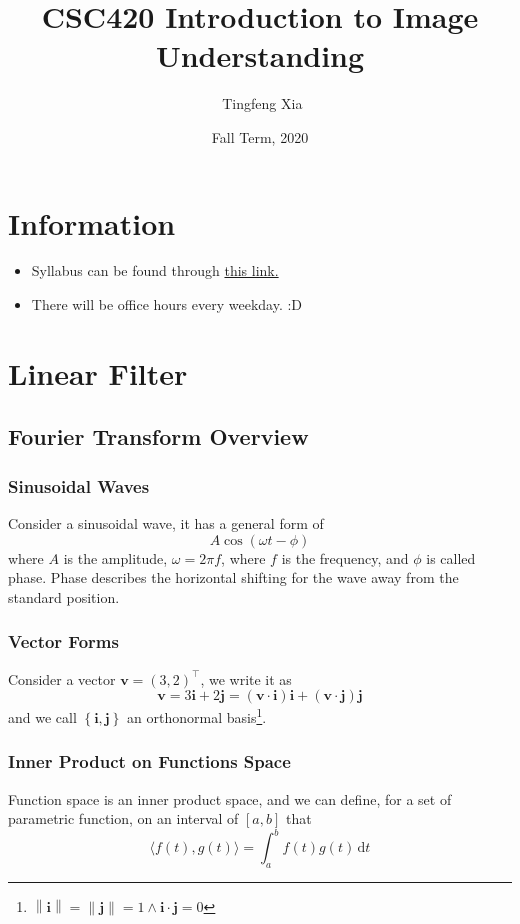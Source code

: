 \documentclass[11pt]{article}
\author{\ccLogo \,\,Tingfeng Xia}
\title{CSC420 Introduction to Image Understanding}
\date{Fall Term, 2020}
\newcommand{\bi}{\mathbf{i}}
\newcommand{\bj}{\mathbf{j}}
\newcommand{\bv}{\mathbf{v}}
\newcommand{\norm}[1]{\left\lVert#1\right\rVert}
\begin{document}
\maketitle
\doclicenseThis
\section*{Information}
\begin{itemize}
	\item Syllabus can be found through \href{https://q.utoronto.ca/courses/181228/files/8680178/preview}{this link. }
	\item There will be office hours every weekday. :D
\end{itemize}
\tableofcontents
\newpage
\section{Linear Filter}
\subsection{Fourier Transform Overview}
\subsubsection{Sinusoidal Waves\label{sec:sinwaves}}
Consider a sinusoidal wave, it has a general form of
\begin{equation}
	A\cos \left( \omega t - \phi \right)
\end{equation}
where $A$ is the amplitude, $\omega = 2\pi f$, where $f$ is the frequency, and $\phi$ is called phase. Phase describes the horizontal shifting for the wave away from the standard position. 

\subsubsection{Vector Forms}
Consider a vector $\bv = \left( 3, 2 \right)^\top$, we write it as 
\begin{equation}
	\bv = 3\bi + 2\bj = (\bv \cdot \bi) \bi + (\bv \cdot \bj) \bj
\end{equation}
and we call $\left\{ \bi, \bj \right\}$ an orthonormal basis\footnote{$\norm{\bi} = \norm{\bj} = 1 \wedge \bi \cdot \bj = 0$}. 

\subsubsection{Inner Product on Functions Space}
Function space is an inner product space, and we can define, for a set of parametric function, on an interval of $[a, b]$ that 
\begin{equation}
	\langle f(t), g(t) \rangle = \int_a^b f(t)g(t) \,\mathrm{d} t
\end{equation}
\end{document}
